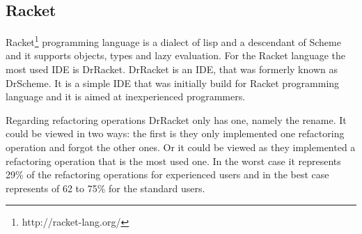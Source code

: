 \subsection{Racket}

Racket\footnote{http://racket-lang.org/} programming language is a dialect of lisp and a descendant of Scheme and it supports objects, types and lazy evaluation.
For the Racket language the most used IDE is DrRacket. 
DrRacket is an IDE, that was formerly known as DrScheme. 
It is a simple IDE that was initially build for Racket programming language and it is aimed at inexperienced programmers.

Regarding refactoring operations DrRacket only has one, namely the rename. 
It could be viewed in two ways: the first is they only implemented one refactoring operation and forgot the other ones.
Or it could be viewed as they implemented a refactoring operation that is the most used one. 
In the worst case it represents 29\% of the refactoring operations for experienced users and in the best case represents of 62 to 75\% for the standard users. 



 